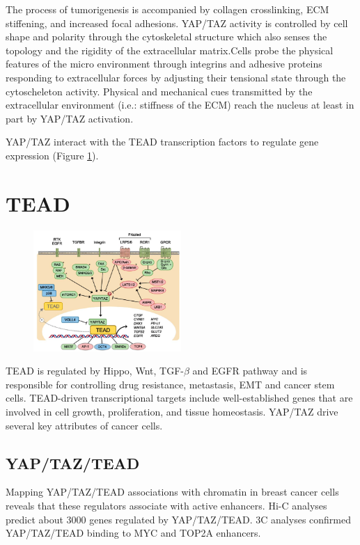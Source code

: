 The process of tumorigenesis is accompanied by collagen crosslinking, ECM stiffening, and increased focal adhesions. YAP/TAZ activity is controlled by cell shape and polarity through the cytoskeletal structure which also senses the topology and the rigidity of the extracellular matrix.Cells probe the physical features of the micro environment through integrins and adhesive proteins responding to extracellular forces by adjusting their tensional state through the cytoscheleton activity. Physical and mechanical cues transmitted by the extracellular environment (i.e.: stiffness of the ECM) reach the nucleus at least in part by YAP/TAZ activation.

YAP/TAZ interact with the TEAD transcription factors to regulate gene expression (Figure \ref{fig:tead}).

\hypertarget{tead}{%
\section{TEAD}\label{tead}}

\begin{figure}
\centering
\includegraphics[width=0.5\textwidth]{../_resources/Screen_Shot_2022-11-13_at_19-48-01.png}
\caption{}
\label{fig:tead}
\end{figure}

TEAD is regulated by Hippo, Wnt, TGF-$\beta$ and EGFR pathway and is responsible for controlling drug resistance, metastasis, EMT and cancer stem cells. TEAD-driven transcriptional targets include well-established genes that are involved in cell growth, proliferation, and tissue homeostasis. YAP/TAZ drive several key attributes of cancer cells.

\hypertarget{yaptaztead}{%
\subsection{YAP/TAZ/TEAD}\label{yaptaztead}}

Mapping YAP/TAZ/TEAD associations with chromatin in breast cancer cells reveals that these regulators associate with active enhancers. Hi-C analyses predict about 3000 genes regulated by YAP/TAZ/TEAD. 3C analyses confirmed YAP/TAZ/TEAD binding to MYC and TOP2A enhancers.

